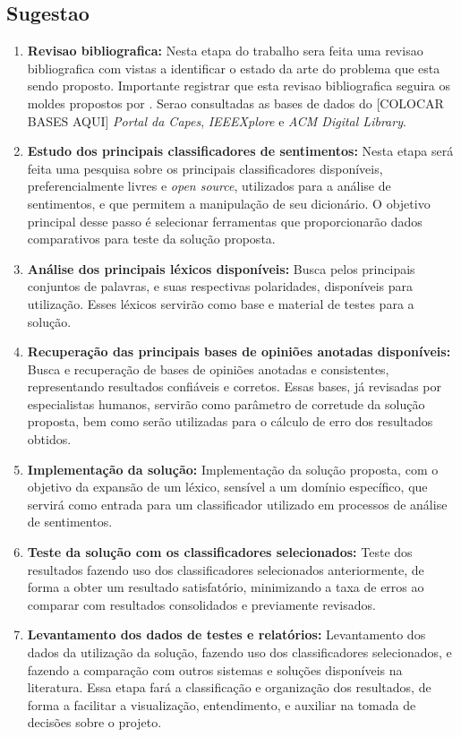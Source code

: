 \documentclass[a4paper,11pt]{article}
\begin{document}
\subsection{Sugestao}
\begin{enumerate}[D1.]
\item{\textbf{Revisao bibliografica:} Nesta etapa do trabalho sera feita uma revisao bibliografica com vistas a identificar o estado da arte do problema que esta sendo proposto. Importante registrar que esta revisao bibliografica seguira os moldes propostos por \cite{Kitchenham2004}}. Serao consultadas as bases de dados do [COLOCAR BASES AQUI] \emph{Portal da Capes}, \emph{IEEEXplore} e \emph{ACM Digital Library}.

\item{\textbf{Estudo dos principais classificadores de sentimentos:}}
Nesta etapa será feita uma pesquisa sobre os principais classificadores disponíveis, preferencialmente livres e \emph{open source}, utilizados para a análise de sentimentos, e que permitem a manipulação de seu dicionário. O objetivo principal desse passo é selecionar ferramentas que proporcionarão dados comparativos para teste da solução proposta.

\item{\textbf{Análise dos principais léxicos disponíveis:}}
Busca pelos principais conjuntos de palavras, e suas respectivas polaridades, disponíveis para utilização. Esses léxicos servirão como base e material de testes para a solução.

\item{\textbf{Recuperação das principais bases de opiniões anotadas disponíveis:}}
Busca e recuperação de bases de opiniões anotadas e consistentes, representando resultados confiáveis e corretos. Essas bases, já revisadas por especialistas humanos, servirão como parâmetro de corretude da solução proposta, bem como serão utilizadas para o cálculo de erro dos resultados obtidos.

\item{\textbf{Implementação da solução:}}
Implementação da solução proposta, com o objetivo da expansão de um léxico, sensível a um domínio específico, que servirá como entrada para um classificador utilizado em processos de análise de sentimentos.

\item{\textbf{Teste da solução com os classificadores selecionados:}}
Teste dos resultados fazendo uso dos classificadores selecionados anteriormente, de forma a obter um resultado satisfatório, minimizando a taxa de erros ao comparar com resultados consolidados e previamente revisados.

\item{\textbf{Levantamento dos dados de testes e relatórios:}}
Levantamento dos dados da utilização da solução, fazendo uso dos classificadores selecionados, e fazendo a comparação com outros sistemas e soluções disponíveis na literatura. Essa etapa fará a classificação e organização dos resultados, de forma a facilitar a visualização, entendimento, e auxiliar na tomada de decisões sobre o projeto.
\end{enumerate}
\end{document}
